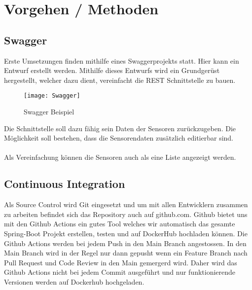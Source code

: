 \documentclass[../main.tex]{subfiles}
\begin{document}
	\section{Vorgehen / Methoden}
	
	\subsection{Swagger}
	Erste Umsetzungen finden mithilfe eines Swaggerprojekts statt. Hier kann ein Entwurf erstellt werden. Mithilfe dieses Entwurfs wird ein Grundgerüst hergestellt, welcher dazu dient, vereinfacht die REST Schnittstelle zu bauen.
	
	\begin{figure}[H]
		\centering
		\texttt{[image: Swagger]}
		\caption{Swagger Beispiel}
		\label{fig:Swagger}
	\end{figure}
	\par
	\noindent
	Die Schnittstelle soll dazu fähig sein Daten der Sensoren zurückzugeben. Die Möglichkeit soll bestehen, dass die Sensorendaten zusätzlich editierbar sind.\\
	\\
	Als Vereinfachung können die Sensoren auch als eine Liste angezeigt werden.
	
	\subsection{Continuous Integration}
	Als Source Control wird Git eingesetzt und um mit allen Entwicklern zusammen zu arbeiten befindet sich das Repository auch auf github.com. Github bietet uns mit den Github Actions ein gutes Tool welches wir automatisch das gesamte Spring-Boot Projekt erstellen, testen und auf DockerHub hochladen können. Die Github Actions werden bei jedem Push in den Main Branch angestossen. In den Main Branch wird in der Regel nur dann gepusht wenn ein Feature Branch nach Pull Request und Code Review in den Main gemergerd wird. Daher wird das Github Actions nicht bei jedem Commit ausgeführt und nur funktionierende Versionen werden auf Dockerhub hochgeladen.
	
\end{document}
